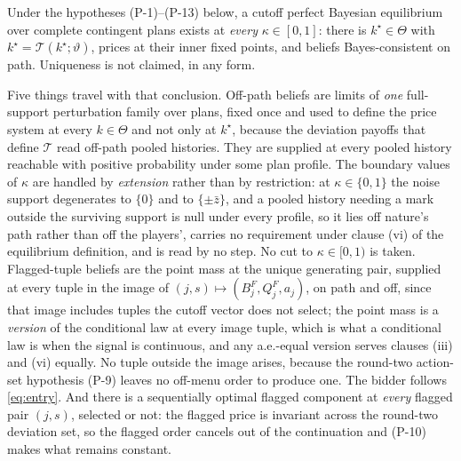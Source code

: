\documentclass[11pt]{article}
\newcommand{\Tmap}{\mathcal{T}}
\begin{document}
Under the hypotheses (P-1)--(P-13) below, a cutoff perfect Bayesian equilibrium over complete
contingent plans exists at \emph{every} $\kappa\in[0,1]$: there is $k^\star\in\Theta$ with
$k^\star=\Tmap(k^\star;\vartheta)$, prices at their inner fixed points, and beliefs Bayes-consistent
on path. Uniqueness is not claimed, in any form.

Five things travel with that conclusion. Off-path beliefs are limits of \emph{one} full-support
perturbation family over plans, fixed once and used to define the price system at every
$k\in\Theta$ and not only at $k^\star$, because the deviation payoffs that define $\Tmap$ read
off-path pooled histories. They are supplied at every pooled history reachable with positive
probability under some plan profile. The boundary values of $\kappa$ are handled by \emph{extension}
rather than by restriction: at $\kappa\in\{0,1\}$ the noise support degenerates to $\{0\}$ and to
$\{\pm\bar z\}$, and a pooled history needing a mark outside the surviving support is null under
every profile, so it lies off nature's path rather than off the players', carries no requirement
under clause (vi) of the equilibrium definition, and is read by no step. No cut to $\kappa\in[0,1)$
is taken. Flagged-tuple beliefs are the point mass at the unique generating pair, supplied at every
tuple in the image of $(j,s)\mapsto(B_j^F,Q_j^F,a_j)$, on path and off, since that image includes
tuples the cutoff vector does not select; the point mass is a \emph{version} of the conditional law
at every image tuple, which is what a conditional law is when the signal is continuous, and any
a.e.-equal version serves clauses (iii) and (vi) equally. No tuple outside the image arises, because
the round-two action-set hypothesis (P-9) leaves no off-menu order to produce one. The bidder
follows \eqref{eq:entry}. And there is a sequentially optimal flagged component at \emph{every}
flagged pair $(j,s)$, selected or not: the flagged price is invariant across the round-two deviation
set, so the flagged order cancels out of the continuation and (P-10) makes what remains constant.
\end{document}

